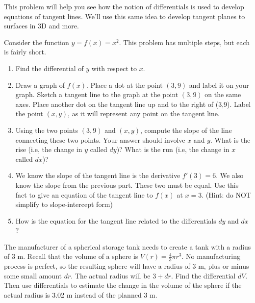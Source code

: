 This problem will help you see how the notion of differentials is used to develop equations of tangent lines. We'll use this same idea to develop tangent planes to surfaces in 3D and more.
\begin{problem} \label{differentials give tangent
    lines}
Consider the function $y=f(x) = x^2$. This problem has multiple steps, but each is fairly short.
\begin{enumerate}
\item Find the differential of $y$ with respect to $x$.  
\item Draw a graph of $f(x)$. Place a dot at the point $(3,9)$ and label it on your graph. Sketch a tangent line to the graph at the point $(3,9)$ on the same axes. Place another dot on the tangent line up and to the right of (3,9). Label the point $(x,y)$, as it will represent any point on the tangent line. 
\item Using the two points $(3,9)$ and $(x,y)$, compute the slope of the line connecting these two points. Your answer should involve $x$ and $y$. What is the rise (i.e, the change in $y$ called $dy$)? What is the run (i.e, the change in $x$ called $dx$)?  
\item We know the slope of the tangent line is the derivative $f'(3)=6$. We also know the slope from the previous part. These two must be equal. Use this fact to give an equation of the tangent line to $f(x)$ at $x=3$. (Hint: do NOT simplify to slope-intercept form)
\item How is the equation for the tangent line related to the differentials $dy$ and $dx$?
\end{enumerate}
\end{problem}
 
\begin{problem} 
	\label{diff-sphere}
The manufacturer of a spherical storage tank needs to create a tank with a radius of 3 m. Recall that the volume of a sphere is $V(r) = \frac{4}{3}\pi r^3$. No manufacturing process is perfect, so the resulting sphere will have a radius of 3 m, plus or minus some small amount $dr$. The actual radius will be $3+dr$. Find the differential $dV$.  Then use differentials to estimate the change in the volume of the sphere if the actual radius is 3.02 m instead of the planned 3 m.    
\end{problem}
 

